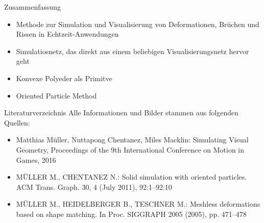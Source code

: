 \documentclass[t]{beamer}
\begin{document}
	\begin{frame}{Zusammenfassung}
		\begin{itemize}
			\item Methode zur Simulation und Visualisierung von Deformationen, Brüchen und Rissen in Echtzeit-Anwendungen
			\item Simulatiosnetz, das direkt aus einem beliebigen Visualisierungsnetz hervor geht
			\item Konvexe Polyeder als Primitve
			\item Oriented Particle Method
		\end{itemize}
	\end{frame}

	\begin{frame}{Literaturverzeichnis}
		Alle Informationen und Bilder stammen aus folgenden Quellen:
		\begin{itemize}
			\item Matthias Müller, Nuttapong Chentanez, Miles Macklin: Simulating Visual Geometry, Proceedings of the 9th International Conference on Motion in Games, 2016
			\item MÜLLER M., CHENTANEZ N.: Solid simulation with oriented particles. ACM Trans. Graph. 30, 4 (July 2011), 92:1–92:10
			\item MÜLLER M., HEIDELBERGER B., TESCHNER M.: Meshless deformations based on shape matching. In Proc. SIGGRAPH 2005 (2005), pp. 471–478
		\end{itemize}
	\end{frame}
\end{document}
